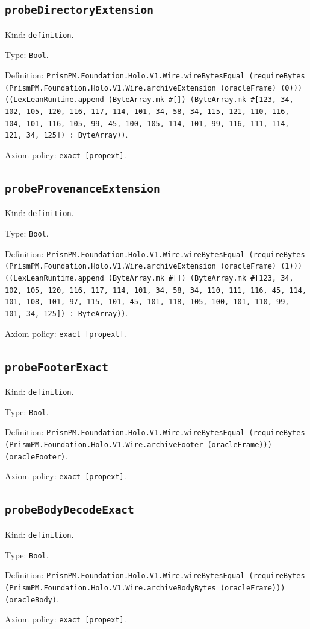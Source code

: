 \documentclass[11pt]{article}
\begin{document}
\subsection*{\texttt{probeDirectoryExtension}}
\noindent Kind: \texttt{definition}.\par
\noindent Type: \texttt{Bool}.\par
\noindent Definition: \texttt{PrismPM.Foundation.Holo.V1.Wire.wireBytesEqual (requireBytes (PrismPM.Foundation.Holo.V1.Wire.archiveExtension (oracleFrame) (0))) ((LexLeanRuntime.append (ByteArray.mk \#[]) (ByteArray.mk \#[123, 34, 102, 105, 120, 116, 117, 114, 101, 34, 58, 34, 115, 121, 110, 116, 104, 101, 116, 105, 99, 45, 100, 105, 114, 101, 99, 116, 111, 114, 121, 34, 125]) : ByteArray))}.\par
\noindent Axiom policy: \texttt{exact [propext]}.\par
\subsection*{\texttt{probeProvenanceExtension}}
\noindent Kind: \texttt{definition}.\par
\noindent Type: \texttt{Bool}.\par
\noindent Definition: \texttt{PrismPM.Foundation.Holo.V1.Wire.wireBytesEqual (requireBytes (PrismPM.Foundation.Holo.V1.Wire.archiveExtension (oracleFrame) (1))) ((LexLeanRuntime.append (ByteArray.mk \#[]) (ByteArray.mk \#[123, 34, 102, 105, 120, 116, 117, 114, 101, 34, 58, 34, 110, 111, 116, 45, 114, 101, 108, 101, 97, 115, 101, 45, 101, 118, 105, 100, 101, 110, 99, 101, 34, 125]) : ByteArray))}.\par
\noindent Axiom policy: \texttt{exact [propext]}.\par
\subsection*{\texttt{probeFooterExact}}
\noindent Kind: \texttt{definition}.\par
\noindent Type: \texttt{Bool}.\par
\noindent Definition: \texttt{PrismPM.Foundation.Holo.V1.Wire.wireBytesEqual (requireBytes (PrismPM.Foundation.Holo.V1.Wire.archiveFooter (oracleFrame))) (oracleFooter)}.\par
\noindent Axiom policy: \texttt{exact [propext]}.\par
\subsection*{\texttt{probeBodyDecodeExact}}
\noindent Kind: \texttt{definition}.\par
\noindent Type: \texttt{Bool}.\par
\noindent Definition: \texttt{PrismPM.Foundation.Holo.V1.Wire.wireBytesEqual (requireBytes (PrismPM.Foundation.Holo.V1.Wire.archiveBodyBytes (oracleFrame))) (oracleBody)}.\par
\noindent Axiom policy: \texttt{exact [propext]}.\par
\end{document}
